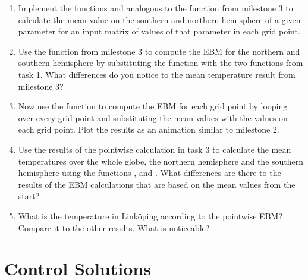 \documentclass[10pt]{scrartcl}
\begin{document}
\begin{enumerate}
\item[1.]Implement the functions \small\texttt{} \normalsize and \small\texttt{} \normalsize analogous to the function \small\texttt{} \normalsize from milestone 3 to calculate the mean value on the southern and northern hemisphere of a given parameter for an input matrix of values of that parameter in each grid point.

\item[2.]Use the \small\texttt{} \normalsize function from milestone 3 to compute the EBM for the northern and southern hemisphere by substituting the \small\texttt{} \normalsize function with the two functions from task 1. What differences do you notice to the mean temperature result from milestone 3?

\item[3.]Now use the \small\texttt{} \normalsize function to compute the EBM for each grid point by looping over every grid point and substituting the mean values with the values on each grid point. Plot the results as an animation similar to milestone 2.

\item[4.]Use the results of the pointwise calculation in task 3 to calculate the mean temperatures over the whole globe, the northern hemisphere and the southern hemisphere using the functions \small\texttt{} \normalsize, \small\texttt{} \normalsize and \small\texttt{} \normalsize. What differences are there to the results of the EBM calculations that are based on the mean values from the start?

\item[5.] What is the temperature in Link\"{o}ping according to the pointwise EBM? Compare it to the other results. What is noticeable?

\end{enumerate}

\newpage

\section{Control Solutions}
\end{document}
